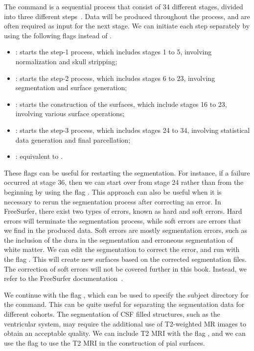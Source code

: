 The command  is a sequential process that consist of 34
different stages, divided into three different
steps~\cite{freesurfer-wiki}. Data will be produced throughout the
process, and are often required as input for the next stage. We can
initiate each step separately by using the following flags instead of
.
\begin{itemize}
\item {}: starts the step-1 process, which includes stages 1 to 5, involving normalization and skull stripping; 
\item {}: starts the step-2 process, which includes stages 6 to 23, involving segmentation and surface generation;
\item {}: starts the construction of the surfaces, which include stages 16 to 23, involving various surface operations;  
\item {}: starts the step-3 process, which includes stages 24 to 34, involving statistical data generation and final parcellation;
\item {}: equivalent to . 
\end{itemize} 

These flags can be useful for restarting the segmentation. For
instance, if a failure occurred at stage 36, then we can start over
from stage 24 rather than from the beginning by using the flag
. This approach can also be useful when it is
necessary to rerun the segmentation process after correcting an
error. In FreeSurfer, there exist two types of errors, known as hard
and soft errors. Hard errors will terminate the segmentation process,
while soft errors are errors that we find in the produced data. Soft
errors are mostly segmentation errors, such as the inclusion of the
dura in the segmentation and erroneous segmentation of white
matter. We can edit the segmentation to correct the error, and run
 with the flag . This will
create new surfaces based on the corrected segmentation files. The
correction of soft errors will not be covered further in this
book. Instead, we refer to the FreeSurfer
documentation~\cite{freesurfer-wiki}.

%
%
We continue with the flag , which can be used to specify the
subject directory for the  command. This can be quite
useful for separating the segmentation data for different
cohorts. The segmentation of CSF filled structures, such as the
ventricular system, may require the additional use of T2-weighted MR
images to obtain an acceptable quality. We can include T2 MRI with the
flag , and we can use the flag  to use
the T2 MRI in the construction of pial surfaces.

